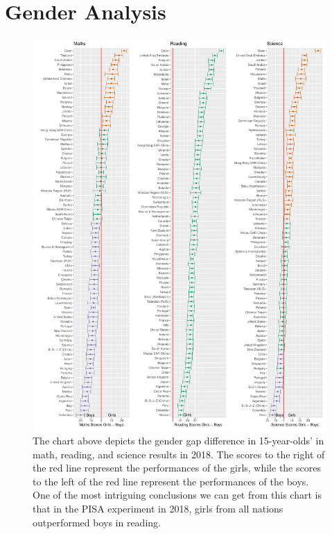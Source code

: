 \hypertarget{gender-analysis}{%
\section{Gender Analysis}\label{gender-analysis}}

\begin{Schunk}
\begin{figure}[H]
\includegraphics[width=1\linewidth]{learningtower_files/figure-latex/score-differences-1} \caption[The chart above depicts the gender gap difference in 15-year-olds' in math, reading, and science results in 2018]{The chart above depicts the gender gap difference in 15-year-olds' in math, reading, and science results in 2018. The scores to the right of the red line represent the performances of the girls, while the scores to the left of the red line represent the performances of the boys. One of the most intriguing conclusions we can get from this chart is that in the PISA experiment in 2018, girls from all nations outperformed boys in reading.}\label{fig:score-differences}
\end{figure}
\end{Schunk}

